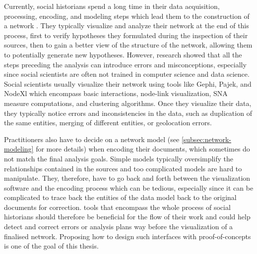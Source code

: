 Currently, social historians spend a long time in their data acquisition, processing, encoding, and modeling steps which lead them to the construction of a network \cite{dufournaudCommentRendreVisible2018, lemercierBackSourcesPracticing2021}.
They typically visualize and analyze their network at the end of this process, first to verify hypotheses they formulated during the inspection of their sources, then to gain a better view of the structure of the network, allowing them to potentially generate new hypotheses\cite{lemercier12FormalNetwork2015}.
However, research showed that all the steps preceding the analysis can introduce errors and misconceptions, especially since social scientists are often not trained in computer science and data science\cite{lemercierQuantitativeMethodsHumanities2019, alkadi2022}.
Social scientists usually visualize their network using \sna tools like Gephi, Pajek, and NodeXl which encompass basic interactions, node-link visualization, SNA measure computations, and clustering algorithms.
Once they visualize their data, they typically notice errors and inconsistencies in the data, such as duplication of the same entities, merging of different entities, or geolocation errors\cite{diesnerImpactEntityDisambiguation2015, alkadi2022}.

Practitioners also have to decide on a network model\cite{cristofoliAuxSourcesGrands2008} (see \autoref{subsec:network-modeling} for more details) when encoding their documents, which sometimes do not match the final analysis goals.
Simple models typically oversimplify the relationships contained in the sources\cite{lemercier12FormalNetwork2015} and too complicated models are hard to manipulate\cite{opitzInductionLargeScaleKnowledge2018}.
They, therefore, have to go back and forth between the visualization software and the encoding process which can be tedious, especially since it can be complicated to trace back the entities of the data model back to the original documents for correction.
\va tools that encompass the whole process of social historians should therefore be beneficial for the flow of their work and could help detect and correct errors or analysis plans way before the visualization of a finalised network.
Proposing how to design such interfaces with proof-of-concepts is one of the goal of this thesis.

